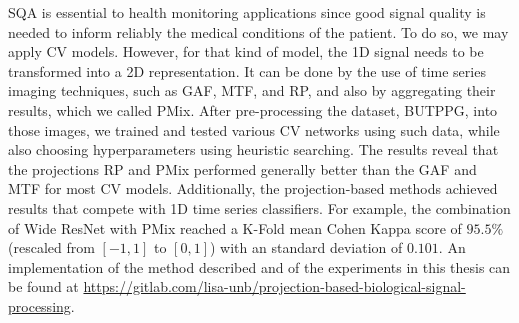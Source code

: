 \gls{SQA} is essential to health monitoring applications since good signal quality is needed to inform reliably the medical conditions of the patient. To do so, we may apply \gls{CV} models. However, for that kind of model, the 1D signal needs to be transformed into a 2D representation. It can be done by the use of time series imaging techniques, such as \gls{GAF}, \gls{MTF}, and \gls{RP}, and also by aggregating their results, which we called \gls{PMix}. After pre-processing the dataset, \gls{BUTPPG}, into those images, we trained and tested various \gls{CV} networks using such data, while also choosing hyperparameters using heuristic searching. The results reveal that the projections \gls{RP} and \gls{PMix} performed generally better than the \gls{GAF} and \gls{MTF} for most \gls{CV} models. Additionally, the projection-based methods achieved results that compete with 1D time series classifiers. For example, the combination of Wide ResNet with \gls{PMix} reached a K-Fold mean Cohen Kappa score of $95.5\%$ (rescaled from $[-1,1]$ to $[0,1]$) with an standard deviation of $0.101$. An implementation of the method described and of the experiments in this thesis can be found at \url{https://gitlab.com/lisa-unb/projection-based-biological-signal-processing}.
